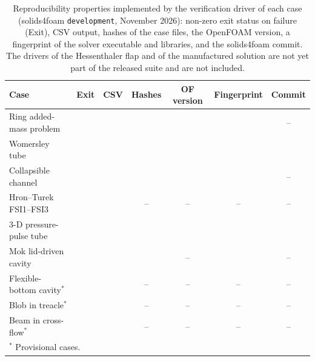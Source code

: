 \begin{table}[htbp]
	\centering
	\footnotesize
	\setlength{\tabcolsep}{4pt}
	\caption{Reproducibility properties implemented by the verification driver of each case (solids4foam \texttt{development}, November 2026): non-zero exit status on failure (Exit), CSV output, hashes of the case files, the OpenFOAM version, a fingerprint of the solver executable and libraries, and the solids4foam commit. The drivers of the Hessenthaler flap and of the manufactured solution are not yet part of the released suite and are not included.}
	\label{tab:driver_properties}
	\begin{tabular}{lcccccc}
		\toprule
		Case & Exit & CSV & Hashes & OF version & Fingerprint & Commit \\
		\midrule
		Ring added-mass problem & \checkmark & \checkmark & \checkmark & \checkmark & \checkmark & -- \\
		Womersley tube & \checkmark & \checkmark & \checkmark & \checkmark & \checkmark & \checkmark \\
		Collapsible channel & \checkmark & \checkmark & \checkmark & \checkmark & \checkmark & -- \\
		Hron--Turek FSI1--FSI3 & \checkmark & \checkmark & -- & -- & -- & -- \\
		3-D pressure-pulse tube & \checkmark & \checkmark & \checkmark & \checkmark & \checkmark & \checkmark \\
		Mok lid-driven cavity & \checkmark & \checkmark & \checkmark & -- & \checkmark & -- \\
		Flexible-bottom cavity$^\ast$ & \checkmark & \checkmark & -- & -- & -- & -- \\
		Blob in treacle$^\ast$ & \checkmark & \checkmark & -- & -- & -- & -- \\
		Beam in cross-flow$^\ast$ & \checkmark & \checkmark & -- & -- & -- & -- \\
		\bottomrule
		\multicolumn{7}{l}{$^\ast$ Provisional cases.}
	\end{tabular}
\end{table}
